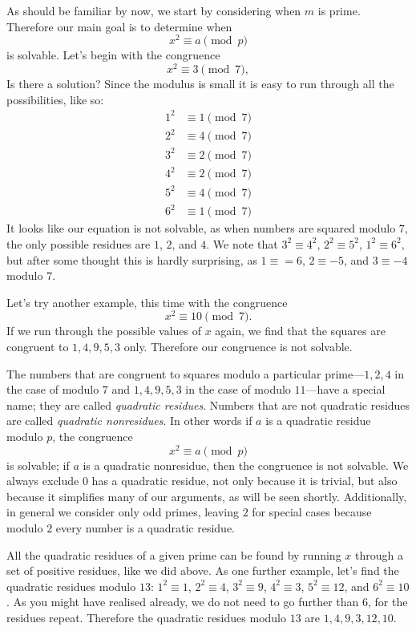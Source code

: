 \documentclass[a4paper]{article}
\newcommand{\marginnote}[1]{\marginpar{\footnotesize{#1}}}
\begin{document}
As should be familiar by now, we start by considering when \(m\)
is prime. Therefore our main goal is to determine when
\[ x^2\equiv a\pmod{p}\] is solvable. Let's begin with the congruence
\[x^2\equiv 3\pmod{7},\] Is there a solution? Since the modulus
is small it is easy to run through all the possibilities, like so:
\[
  \begin{split}
    1^2&\equiv1\pmod{7}\\
    2^2&\equiv4\pmod{7}\\
    3^2&\equiv2\pmod{7}\\
    4^2&\equiv2\pmod{7}\\
    5^2&\equiv4\pmod{7}\\
    6^2&\equiv1\pmod{7}
  \end{split}
\]
It looks like our equation is not solvable, as when numbers
are squared modulo \(7\), the only possible residues are \(1\), \(2\),
and \(4\). 
We note that \(3^2\equiv4^2\), \(2^2\equiv5^2\), \(1^2\equiv6^2\), but
after some thought this is hardly surprising, as \(1\equiv=6\), \(2\equiv-5\), and \(3\equiv-4\)
modulo \(7\).

Let's try another example, this time with the congruence \[x^2\equiv 10\pmod{7}.\]
If we run through the possible values of \(x\) again, we find that the squares
are congruent to \(1,4,9,5,3\) only. Therefore our congruence is not solvable.

The numbers that are congruent to squares modulo a particular prime---\(1,2,4\) in the case of modulo \(7\) and
\(1,4,9,5,3\) in the case of modulo \(11\)---have a special name; they
are called \emph{quadratic residues}.
Numbers that are not quadratic residues are called \emph{quadratic nonresidues}.
In other words if \(a\) is a quadratic residue modulo \(p\),
the congruence \[x^2\equiv a\pmod{p}\] is solvable; if \(a\) is a quadratic nonresidue,
then the congruence is not solvable.
 We always exclude \(0\) has a quadratic
residue, not only because it is trivial, but also because it simplifies many of 
our arguments, as will be seen shortly. Additionally, in general we consider only odd primes, leaving \(2\) for special cases because modulo \(2\)
 every number is a quadratic residue.

All the quadratic residues of a given prime can be found by running \(x\)
through a set of positive residues, like we did above. As one further example,
let's find the quadratic residues modulo \(13\): \(1^2\equiv1\), \(2^2\equiv4\),
\(3^2\equiv9\), \(4^2\equiv3\), \(5^2\equiv12\), and \(6^2\equiv10\). As you 
might have realised already, we do not need to go further than \(6\), for the
residues repeat.\marginnote{That is, \(7^2\equiv10\), \(8^2\equiv12\), and so on, as you can verify.}
Therefore the quadratic residues modulo \(13\) are \(1,4,9,3,12,10\).
\end{document}
